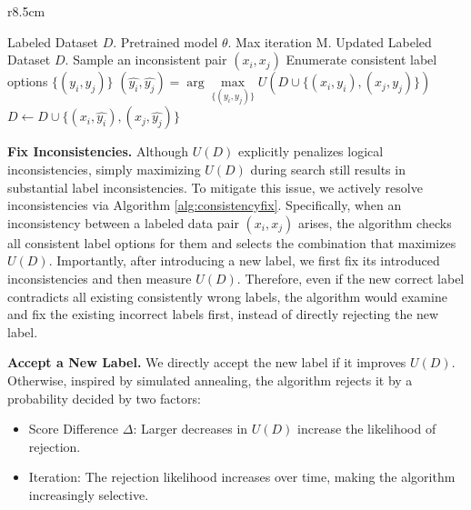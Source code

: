 \documentclass{article}
\begin{document}
\begin{wrapfigure}{r}{8.5cm}
    \vspace{-8mm}
    \begin{minipage}{8.5cm}
    \begin{algorithm}[H]
    \small
    \caption{ConsistencyFix}
    \begin{algorithmic}[1]
    \Require Labeled Dataset $D$. 
    Pretrained model $\theta$. Max iteration M.
    \Ensure Updated Labeled Dataset $D$.
    \State Sample an inconsistent pair $(x_i, x_j)$
    \State Enumerate consistent label options $\{(y_i, y_j)\}$
    \State $(\hat{y_i}, \hat{y_j}) = \arg\max\limits_{\{(y_i, y_j)\}} U(D \cup \{(x_i, y_i), (x_j, y_j)\})$
    \State $D \leftarrow D \cup \{(x_i, \hat{y_i}), (x_j, \hat{y_j})\}$
    \EndIf
    \EndIf
    \EndFor
    \end{algorithmic}
    \label{alg:consistencyfix}
    \end{algorithm}
    \end{minipage}
    \vspace{-5mm}
\end{wrapfigure}


\textbf{Fix Inconsistencies.} Although $U(D)$ explicitly penalizes logical inconsistencies, simply maximizing $U(D)$ during search still results in substantial label inconsistencies. To mitigate this issue, we actively resolve inconsistencies via Algorithm \ref{alg:consistencyfix}. Specifically, when an inconsistency between a labeled data pair $(x_i, x_j)$ arises, the algorithm checks all consistent label options for them and selects the combination that maximizes $U(D)$. Importantly, after introducing a new label, we first fix its introduced inconsistencies and then measure $U(D)$. Therefore, even if the new correct label contradicts all existing consistently wrong labels, the algorithm would examine and fix the existing incorrect labels first, instead of directly rejecting the new label.


\textbf{Accept a New Label.} We directly accept the new label if it improves $U(D)$. Otherwise, inspired by simulated annealing, the algorithm rejects it by a probability decided by two factors:
\begin{itemize} [leftmargin=*, topsep=-1pt, itemsep=-2pt]
    \item Score Difference $\Delta$:  Larger decreases in $U(D)$ increase the likelihood of rejection.
    \item Iteration: The rejection likelihood increases over time, making the algorithm increasingly selective.
\end{itemize}
\end{document}
